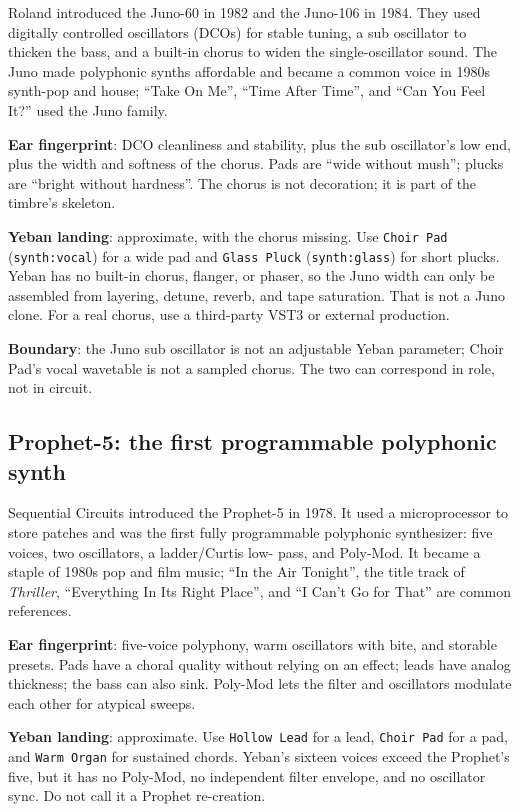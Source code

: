 Roland introduced the Juno-60 in 1982 and the Juno-106 in 1984. They used
digitally controlled oscillators (DCOs) for stable tuning, a sub oscillator
to thicken the bass, and a built-in chorus to widen the single-oscillator
sound. The Juno made polyphonic synths affordable and became a common voice
in 1980s synth-pop and house; ``Take On Me'', ``Time After Time'', and ``Can
You Feel It?'' used the Juno family.

\textbf{Ear fingerprint}: DCO cleanliness and stability, plus the sub
oscillator's low end, plus the width and softness of the chorus. Pads are
``wide without mush''; plucks are ``bright without hardness''. The chorus is
not decoration; it is part of the timbre's skeleton.

\textbf{Yeban landing}: approximate, with the chorus missing. Use
\texttt{Choir Pad} (\texttt{synth:vocal}) for a wide pad and
\texttt{Glass Pluck} (\texttt{synth:glass}) for short plucks. Yeban has no
built-in chorus, flanger, or phaser, so the Juno width can only be assembled
from layering, detune, reverb, and tape saturation. That is not a Juno clone.
For a real chorus, use a third-party VST3 or external production.

\textbf{Boundary}: the Juno sub oscillator is not an adjustable Yeban
parameter; Choir Pad's vocal wavetable is not a sampled chorus. The two can
correspond in role, not in circuit.

\subsection{Prophet-5: the first programmable polyphonic synth}
\label{sec:iconic-prophet}

Sequential Circuits introduced the Prophet-5 in 1978. It used a
microprocessor to store patches and was the first fully programmable
polyphonic synthesizer: five voices, two oscillators, a ladder/Curtis low-
pass, and Poly-Mod. It became a staple of 1980s pop and film music;
``In the Air Tonight'', the title track of \emph{Thriller}, ``Everything In
Its Right Place'', and ``I Can't Go for That'' are common references.

\textbf{Ear fingerprint}: five-voice polyphony, warm oscillators with bite,
and storable presets. Pads have a choral quality without relying on an effect;
leads have analog thickness; the bass can also sink. Poly-Mod lets the filter
and oscillators modulate each other for atypical sweeps.

\textbf{Yeban landing}: approximate. Use \texttt{Hollow Lead} for a lead,
\texttt{Choir Pad} for a pad, and \texttt{Warm Organ} for sustained chords.
Yeban's sixteen voices exceed the Prophet's five, but it has no Poly-Mod,
no independent filter envelope, and no oscillator sync. Do not call it a
Prophet re-creation.

